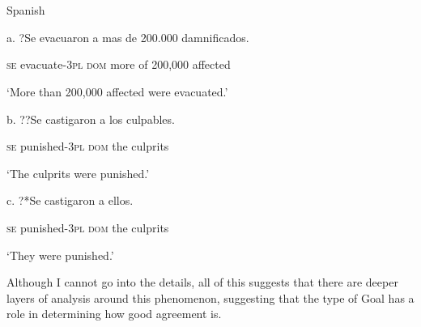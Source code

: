 \documentclass[output=paper]{langsci/langscibook}
\begin{document}
\begin{styleHTMLPreformatted}
\ea%
    \label{ex:key:42}
    \gll\\
        \\
    \glt
    \z

          Spanish
\end{styleHTMLPreformatted}

\begin{styleHTMLPreformatted}
a.   ?Se  evacuaron      a         mas   de  200.000  damnificados. 
\end{styleHTMLPreformatted}

\begin{styleHTMLPreformatted}
         \textsc{se} evacuate{}-\textsc{3pl} \textsc{dom} more of  200,000  affected
\end{styleHTMLPreformatted}

\begin{styleHTMLPreformatted}
          ‘More than 200,000 affected were evacuated.’
\end{styleHTMLPreformatted}

\begin{styleHTMLPreformatted}
  b.   ??Se  castigaron       a          los   culpables.   
\end{styleHTMLPreformatted}

\begin{styleHTMLPreformatted}
            \textsc{se} punished{}-\textsc{3pl}  \textsc{dom} the   culprits
\end{styleHTMLPreformatted}

\begin{styleHTMLPreformatted}
            ‘The culprits were punished.’
\end{styleHTMLPreformatted}

\begin{styleHTMLPreformatted}
  c.   ?*Se  castigaron        a        ellos. 
\end{styleHTMLPreformatted}

\begin{styleHTMLPreformatted}
                     \textsc{se} punished{}-\textsc{3pl}  \textsc{dom} the   culprits
\end{styleHTMLPreformatted}

\begin{styleHTMLPreformatted}
            ‘They were punished.’
\end{styleHTMLPreformatted}

\begin{styleHTMLPreformatted}
Although I cannot go into the details, all of this suggests that there are deeper layers of analysis around this phenomenon, suggesting that the type of Goal has a role in determining how good agreement is.
\end{styleHTMLPreformatted}
\end{document}
